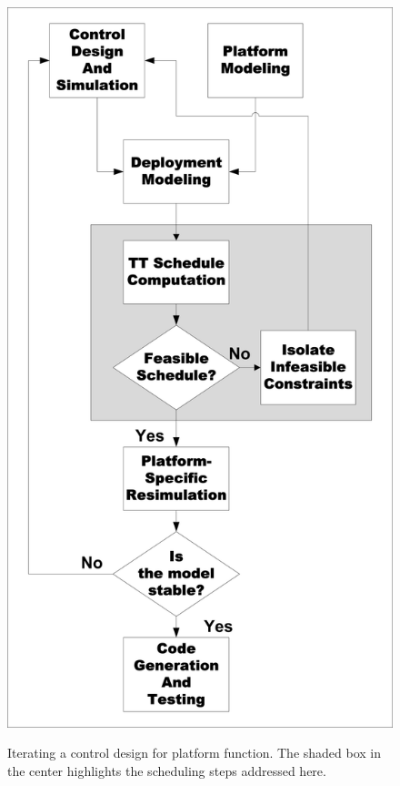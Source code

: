 \begin{figure}[ht]
		\includegraphics[scale=.6]{figures/flowchart.png}
		\centering
	  \label{fig:flowchart}
		\caption{Iterating a control design for platform function. The shaded box in the center highlights the scheduling steps addressed here.}
\end{figure}



